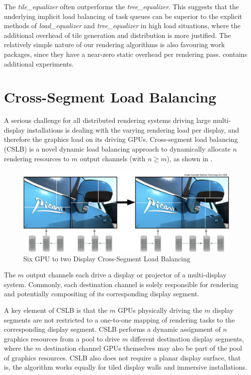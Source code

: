 The {\em tile\_equalizer} often outperforms the {\em tree\_equalizer}. This
suggests that the underlying implicit load balancing of task queues can be
superior to the explicit methods of {\em load\_equalizer} and
{\em tree\_equalizer} in high load situations, where the additional overhead
of tile generation and distribution is more justified. The relatively simple
nature of our rendering algorithms is also favouring
work packages, since they have a near-zero static overhead per rendering pass.
\cite{SPEP:16} contains additional experiments.

\section{Cross-Segment Load Balancing}

A serious challenge for all distributed rendering systems driving large
multi-display installations is dealing with the varying rendering load per
display, and therefore the graphics load on its driving GPUs. Cross-segment load
balancing (CSLB) is a novel dynamic load balancing approach to dynamically
allocate $n$ rendering resources to $m$ output channels (with $n\geq m$), as
shown in .

\begin{figure}[h!t]
  \includegraphics[width=\textwidth]{images/vieweq}
  \caption{\label{fvieweq}Six GPU to two Display Cross-Segment Load Balancing}
\end{figure}

The $m$ output channels each drive a display or projector of a multi-display
system. Commonly, each destination channel is solely responsible for rendering
and potentially compositing of its corresponding display segment.

A key element of CSLB is that the $m$ GPUs physically driving the $m$ display
segments are not restricted to a one-to-one mapping of rendering tasks to the
corresponding display segment. CSLB performs a dynamic assignment of $n$
graphics resources from a pool to drive $m$ different destination display
segments, where the $m$ destination channel GPUs themselves may also be part of
the pool of graphics resources. CSLB also does not require a planar display
surface, that is, the algorithm works equally for tiled display walls and
immersive installations.

